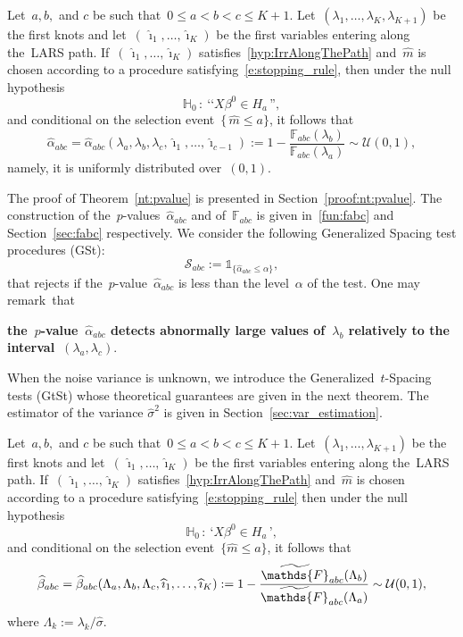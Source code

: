 \documentclass[final,numbib]{imaiai}%
\numberwithin{equation}{section}
\def\eq{\begin{equation}}
\def\qe{\end{equation}}
\def\cS{\mathcal{S}}
\def\cU{\mathcal{U}}
\def\bbF{\mathds{F}}
\renewcommand{\hat}{\widehat}
\renewcommand{\tilde}{\widetilde}
\newcommand{\<}{\langle}
\renewcommand{\>}{\rangle}
\newcommand{\1}{\mathds{1}}
\begin{document}
{{\begin{theorem}
\label{nt:pvalue}
Let~$a, b,$ and $c$ be such that~$0\leq a<b<c\leq K+1$.
Let~$(\lambda_1,\ldots, \lambda_K,\lambda_{K+1})$ be the first knots and let~$(\,\hat \imath_1,\ldots, \hat \imath_K)$ be the first variables entering along the~LARS path.
If~$(\,\hat \imath_1,\ldots, \hat \imath_K)$ satisfies~\eqref{hyp:IrrAlongThePath} and~$\hat m$ is chosen according to a procedure satisfying~{\eqref{e:stopping_rule}}, then under the null hypothesis
\[
\mathds H_0\,:\ \text{‘‘}X\beta^0\in H_{a}\,\text{''},
\] 
and conditional on the selection event~$\big\{\,\hat m\leq a\big\}$, it follows that
\eq
\label{zaza5}
\hat\alpha_{abc}=\hat\alpha_{abc}(\lambda_a,\lambda_b,\lambda_c, \hat \imath_{1}, \ldots,\hat \imath_{c-1}):=1-\frac{\bbF_{abc}(\lambda_b)}{\bbF_{abc}(\lambda_a)}\sim\cU(0,1),
\qe
namely, it is uniformly distributed over~$(0,1)$.
\end{theorem}
\noindent
The proof of Theorem~\ref{nt:pvalue} is presented in Section~\ref{proof:nt:pvalue}. The construction of the~$p$-values~$\hat\alpha_{abc}$ and of~$\bbF_{abc}$ is given in~\eqref{fun:fabc} and Section~\ref{sec:fabc} respectively. We consider the following Generalized Spacing test procedures (GSt):
\eq
\label{zaza6}
\cS_{abc}:=\mathds1_{\{\hat\alpha_{abc}\leq\alpha\}},
\qe
that rejects if the~$p$-value~$\hat\alpha_{abc}$ is less than the level~$\alpha$ of the test. One may remark~that 
\begin{center}
{\bf the~$p$-value~$\hat\alpha_{abc}$ detects abnormally large values of~$\lambda_b$ relatively to the interval~$(\lambda_a,\lambda_c)$}.
\end{center}
\noindent
When the noise variance is unknown, we introduce the Generalized~$t$-Spacing tests (GtSt) whose theoretical guarantees are given in the next theorem. The estimator of the variance $\hat\sigma^2$ is given in Section~\ref{sec:var_estimation}.
\begin{theorem}%
\label{t:pvalue}
Let~$a, b,$ and $c$ be such that~$0\leq a<b<c\leq K+1$.
Let~$(\lambda_1,\ldots, \lambda_{K+1})$ be the first knots and let~$(\,\hat \imath_1,\ldots, \hat \imath_K)$ be the first variables entering along the~LARS path.
If~$(\,\hat \imath_1,\ldots, \hat \imath_K)$ satisfies~\eqref{hyp:IrrAlongThePath} and~$\hat m$ is chosen according to a procedure satisfying~{\eqref{e:stopping_rule}} then under the null hypothesis
\[
\mathds H_0\,:\ \text{`}X\beta^0\in H_{a}\,\text{'},
\] 
and conditional on the selection event~$\big\{\hat m \leq a\big\}$, it follows that
\[
 \hat  \beta_{abc}= \hat  \beta_{abc}( {\Lambda_a},{ \Lambda_b},{ \Lambda_c}, \hat \imath_1, \ldots, \hat \imath_{K}):= 1 - 
  \frac{\tilde\bbF_{abc}(\Lambda_b)}
 {\tilde\bbF_{abc}(\Lambda_a)}\sim \cU(0,1),
\]
where $\Lambda_k:=\lambda_k/\hat\sigma$.
\end{theorem}

}}
\end{document}
